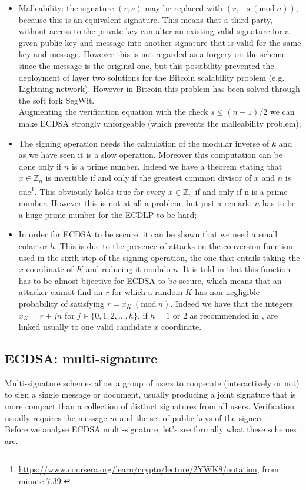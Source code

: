 \begin{itemize}
	\item Malleability: the signature $(r, s)$ may be replaced with $(r, -s \ (\text{mod} \ n))$, because this is an equivalent signature. This means that a third party, without access to the private key can alter an existing valid signature for a given public key and message into another signature that is valid for the same key and message. However this is not regarded as a forgery on the scheme since the message is the original one, but this possibility prevented the deployment of layer two solutions for the Bitcoin scalability problem (e.g. Lightning network). However in Bitcoin this problem has been solved through the soft fork SegWit.
	\\
	Augmenting the verification equation with the check $s \leq (n - 1) / 2$ we can make ECDSA strongly unforgeable (which prevents the malleability problem);
	\item The signing operation needs the calculation of the modular inverse of $k$ and as we have seen it is a slow operation. Moreover this computation can be done only if $n$ is a prime number. Indeed we have a theorem stating that $x \in \mathbb{Z}_n$ is invertible if and only if the greatest common divisor of $x$ and $n$ is one\footnote{\url{https://www.coursera.org/learn/crypto/lecture/2YWK8/notation}, from minute 7.39.}. This obviously holds true for every $x \in \mathbb{Z}_n$ if and only if n is a prime number. However this is not at all a problem, but just a remark: $n$ has to be a huge prime number for the ECDLP to be hard;
	\item In order for ECDSA to be secure, it can be shown that we need a small cofactor $h$. This is due to the presence of attacks on the conversion function used in the sixth step of the signing operation, the one that entails taking the $x$ coordinate of $K$ and reducing it modulo $n$. It is told in \cite{RefWork:2} that this function has to be almost bijective for ECDSA to be secure, which means that an attacker cannot find an $r$ for which a random $K$ has non negligible probability of satisfying $r = x_K \ (\text{mod} \ n)$. Indeed we have that the integers $x_K = r + jn$ for $j \in \{0, 1, 2, ..., h\}$, if $h = 1$ or 2 as recommended in \cite{RefWork:3}, are linked usually to one valid candidate $x$ coordinate.
\end{itemize}

\bigskip

\subsection{ECDSA: multi-signature}
Multi-signature schemes allow a group of users to cooperate (interactively or not) to sign a single message or document, usually producing a joint signature that is more compact than a collection of distinct signatures from all users. Verification usually requires the message $m$ and the set of public keys of the signers.
\\
Before we analyse ECDSA multi-signature, let's see formally what these schemes are.

